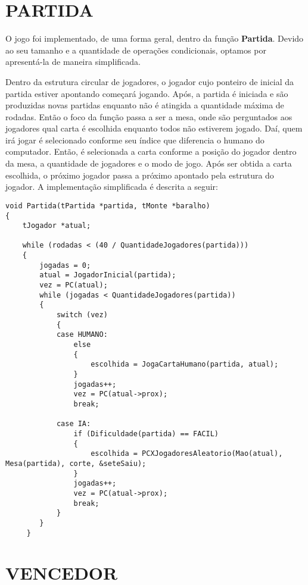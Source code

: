 \documentclass[12pt, oneside, a4paper, brazil]{abntex2}
\begin{document}
\section{PARTIDA} \label{se:partida}

O jogo foi implementado, de uma forma geral, dentro da função \textbf{Partida}. Devido ao seu tamanho e a quantidade de operações condicionais, optamos por apresentá-la de maneira simplificada.

Dentro da estrutura circular de jogadores, o jogador cujo ponteiro de inicial da partida estiver apontando começará jogando. Após, a partida é iniciada e são produzidas novas partidas enquanto não é atingida a quantidade máxima de rodadas. Então o foco da função passa a ser a mesa, onde são perguntados aos jogadores qual carta é escolhida enquanto todos não estiverem jogado. Daí, quem irá jogar é selecionado conforme seu índice que diferencia o humano do computador. Então, é selecionada a carta conforme a posição do jogador dentro da mesa, a quantidade de jogadores e o modo de jogo. Após ser obtida a carta escolhida, o próximo jogador passa a próximo apontado pela estrutura do jogador.
A implementação simplificada é descrita a seguir:

\begin{lstlisting}
void Partida(tPartida *partida, tMonte *baralho)
{
    tJogador *atual;
    
    while (rodadas < (40 / QuantidadeJogadores(partida)))
    {
        jogadas = 0;
        atual = JogadorInicial(partida);
        vez = PC(atual);
        while (jogadas < QuantidadeJogadores(partida))
        {
            switch (vez)
            {
            case HUMANO:
                else
                {
                    escolhida = JogaCartaHumano(partida, atual);
                }
                jogadas++;
                vez = PC(atual->prox);
                break;

            case IA:
                if (Dificuldade(partida) == FACIL)
                {
                    escolhida = PCXJogadoresAleatorio(Mao(atual), Mesa(partida), corte, &seteSaiu);
                }
                jogadas++;
                vez = PC(atual->prox);
                break;
            }
        }
     }
\end{lstlisting}


\section{VENCEDOR}
\end{document}
